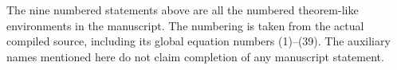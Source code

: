 \normalsize
The nine numbered statements above are all the numbered theorem-like environments in the manuscript. The numbering is taken from the actual compiled source, including its global equation numbers (1)--(39). The auxiliary names mentioned here do not claim completion of any manuscript statement.

\fi
